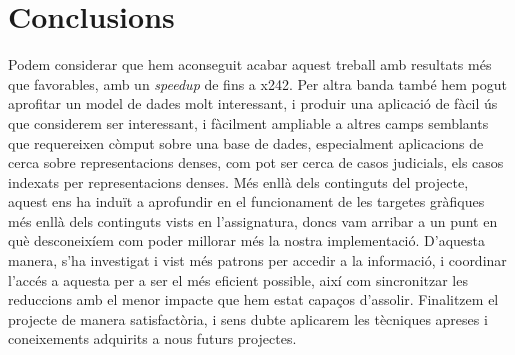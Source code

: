 \documentclass[catalan,10pt,a4paper]{article}
\begin{document}
\section*{Conclusions}
Podem considerar que hem aconseguit acabar aquest treball amb resultats més que favorables, amb un \textit{speedup} de fins a x242. Per altra banda també hem pogut aprofitar un model de dades molt interessant, i produir una aplicació de fàcil ús que considerem ser interessant, i fàcilment ampliable a altres camps semblants que requereixen còmput sobre una base de dades, especialment aplicacions de cerca sobre representacions denses, com pot ser cerca de casos judicials, els casos indexats per representacions denses.
Més enllà dels continguts del projecte, aquest ens ha induït a aprofundir en el funcionament de les targetes gràfiques més enllà dels continguts vists en l'assignatura, doncs vam arribar a un punt en què desconeixíem com poder millorar més la nostra implementació. D'aquesta manera, s'ha investigat i vist més patrons per accedir a la informació, i coordinar l'accés a aquesta per a ser el més eficient possible, així com sincronitzar les reduccions amb el menor impacte que hem estat capaços d'assolir.
Finalitzem el projecte de manera satisfactòria, i sens dubte aplicarem les tècniques apreses i coneixements adquirits a nous futurs projectes.
\newpage


\end{document}
